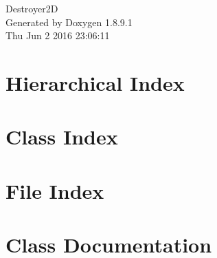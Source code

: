 \documentclass[twoside]{book}
\newcommand{\+}{\discretionary{\mbox{\scriptsize$\hookleftarrow$}}{}{}}
\newcommand{\clearemptydoublepage}{%
  \newpage{\pagestyle{empty}\cleardoublepage}%
}
\begin{document}
\hypersetup{pageanchor=false,
             bookmarks=true,
             bookmarksnumbered=true,
             pdfencoding=unicode
            }
\begin{titlepage}
\vspace*{7cm}
\begin{center}%
{\Large Destroyer2\+D }\\
\vspace*{1cm}
{\large Generated by Doxygen 1.8.9.1}\\
\vspace*{0.5cm}
{\small Thu Jun 2 2016 23:06:11}\\
\end{center}
\end{titlepage}
\clearemptydoublepage
\tableofcontents
\clearemptydoublepage
{}
\hypersetup{pageanchor=true}

\chapter{Hierarchical Index}

\chapter{Class Index}

\chapter{File Index}

\chapter{Class Documentation}










































\end{document}
